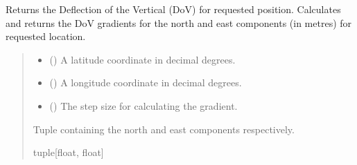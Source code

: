 \documentclass[letterpaper,10pt,english]{sphinxmanual}
\begin{document}
\begin{fulllineitems}
\begin{fulllineitems}
\label{\detokenize{modules/earth/geoid:qnav.earth.geoid.GeoidPGM.get_dov}}
\pysigstartsignatures
{}
\pysigstopsignatures
\sphinxAtStartPar
Returns the Deflection of the Vertical (DoV) for requested position.
Calculates and returns the DoV gradients for the north and east
components (in metres) for requested location.
\begin{quote}\begin{description}
\begin{itemize}
\item {} 
\sphinxAtStartPar
{} () \textendash{} A latitude coordinate in decimal degrees.

\item {} 
\sphinxAtStartPar
{} () \textendash{} A longitude coordinate in decimal degrees.

\item {} 
\sphinxAtStartPar
{} () \textendash{} The step size for calculating the gradient.

\end{itemize}

\sphinxAtStartPar
Tuple containing the north and east components respectively.

\sphinxAtStartPar
tuple{[}float, float{]}

\end{description}\end{quote}

\end{fulllineitems}



\end{fulllineitems}
\end{document}

